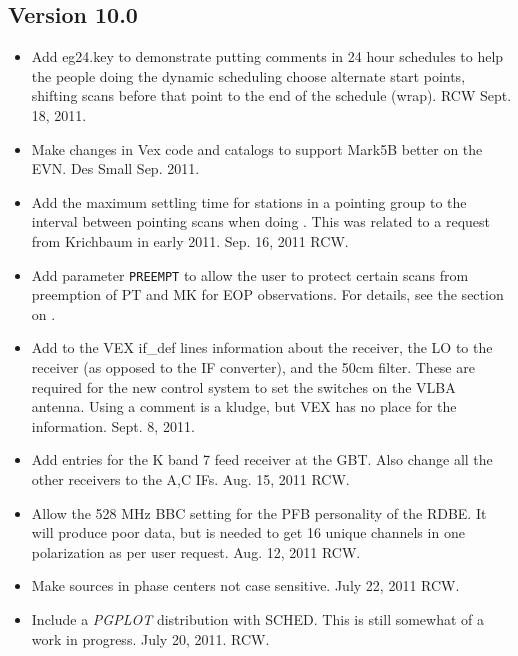 \documentclass{report}
\newcommand{\sched}{{\sc SCHED}}
\begin{document}
\subsection{\label{SSEC:VER_10.0}Version 10.0}

\begin{itemize}

\item Add eg24.key to demonstrate putting comments in 24 hour schedules
to help the people doing the dynamic scheduling choose alternate 
start points, shifting scans before that point to the end of the schedule
(wrap).  RCW  Sept. 18, 2011.

\item Make changes in Vex code and catalogs to support Mark5B better
on the EVN.  Des Small Sep. 2011.

\item Add the maximum settling time for stations in a pointing group
to the interval between pointing scans when doing 
.  This was related to a 
request from Krichbaum in early 2011.  Sep. 16, 2011  RCW.

\item Add parameter {\tt PREEMPT} to allow the user to protect certain
scans from preemption of PT and MK for EOP observations. For details,
see the section on .

\item Add to the VEX if\_def lines information about the receiver, the
LO to the receiver (as opposed to the IF converter), and the 50cm
filter.  These are required for the new control system to set the
switches on the VLBA antenna.  Using a comment is a kludge, but VEX
has no place for the information.  Sept. 8, 2011.

\item Add entries for the K band 7 feed receiver at the GBT.  Also 
change all the other receivers to the A,C IFs.  Aug. 15, 2011  RCW.

\item Allow the 528 MHz BBC setting for the PFB personality of the
RDBE.  It will produce poor data, but is needed to get 16 unique
channels in one polarization as per user request.  Aug. 12, 2011  RCW.

\item Make sources in phase centers not case sensitive.  July 22, 2011 RCW.

\item Include a {\sl PGPLOT} distribution with \sched.  
This is still somewhat of a work in progress.  July 20, 2011. RCW.


\end{itemize}
\end{document}
